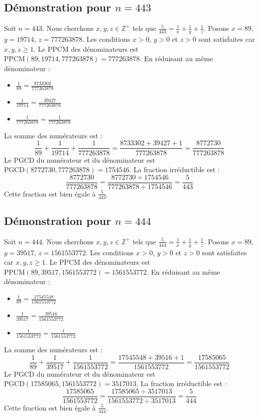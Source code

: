 \documentclass[11pt,a4paper]{article}
\begin{document}
\subsection{Démonstration pour $n = 443$}
Soit $n = 443$. Nous cherchons $x, y, z \in \mathbb{Z}^{+}$ tels que $\frac{5}{443} = \frac{1}{x} + \frac{1}{y} + \frac{1}{z}$.
Posons $x = 89$, $y = 19714$, $z = 777263878$.
Les conditions $x > 0$, $y > 0$ et $z > 0$ sont satisfaites car $x, y, z \geq 1$.
Le PPCM des dénominateurs est $\text{PPCM}(89, 19714, 777263878) = 777263878$.
En réduisant au même dénominateur :
\begin{itemize}
    \item $\frac{1}{89} = \frac{8733302}{777263878}$
    \item $\frac{1}{19714} = \frac{39427}{777263878}$
    \item $\frac{1}{777263878} = \frac{1}{777263878}$
\end{itemize}
La somme des numérateurs est :
$$ \frac{1}{89} + \frac{1}{19714} + \frac{1}{777263878} = \frac{8733302 + 39427 + 1}{777263878} = \frac{8772730}{777263878} $$
Le PGCD du numérateur et du dénominateur est $\text{PGCD}(8772730, 777263878) = 1754546$.
La fraction irréductible est :
$$ \frac{8772730}{777263878} = \frac{8772730 \div 1754546}{777263878 \div 1754546} = \frac{5}{443} $$
Cette fraction est bien égale à $\frac{5}{443}$.

\subsection{Démonstration pour $n = 444$}
Soit $n = 444$. Nous cherchons $x, y, z \in \mathbb{Z}^{+}$ tels que $\frac{5}{444} = \frac{1}{x} + \frac{1}{y} + \frac{1}{z}$.
Posons $x = 89$, $y = 39517$, $z = 1561553772$.
Les conditions $x > 0$, $y > 0$ et $z > 0$ sont satisfaites car $x, y, z \geq 1$.
Le PPCM des dénominateurs est $\text{PPCM}(89, 39517, 1561553772) = 1561553772$.
En réduisant au même dénominateur :
\begin{itemize}
    \item $\frac{1}{89} = \frac{17545548}{1561553772}$
    \item $\frac{1}{39517} = \frac{39516}{1561553772}$
    \item $\frac{1}{1561553772} = \frac{1}{1561553772}$
\end{itemize}
La somme des numérateurs est :
$$ \frac{1}{89} + \frac{1}{39517} + \frac{1}{1561553772} = \frac{17545548 + 39516 + 1}{1561553772} = \frac{17585065}{1561553772} $$
Le PGCD du numérateur et du dénominateur est $\text{PGCD}(17585065, 1561553772) = 3517013$.
La fraction irréductible est :
$$ \frac{17585065}{1561553772} = \frac{17585065 \div 3517013}{1561553772 \div 3517013} = \frac{5}{444} $$
Cette fraction est bien égale à $\frac{5}{444}$.
\end{document}
